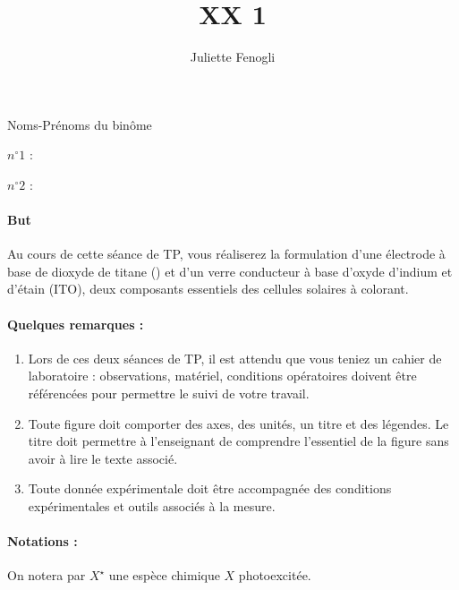 \documentclass[twoside,a4paper,11pt,addpoints,answers]{exam}%
\title{XX 1}
\date{}
\author{Juliette Fenogli}
\begin{document}
\begin{minipage}{0.33\textwidth}
Noms-Prénoms du binôme
\end{minipage}\begin{minipage}{0.33\textwidth}
$n^\circ 1$ :
\end{minipage}\begin{minipage}{0.33\textwidth}
$n^\circ 2$ :
\end{minipage}




\paragraph*{But} 
Au cours de cette séance de TP, vous réaliserez la formulation d'une électrode à base de dioxyde de titane () et d'un verre conducteur à base d'oxyde d'indium et d'étain (ITO), deux composants essentiels des cellules solaires à colorant.



\paragraph*{Quelques remarques :}
\begin{enumerate}
\item {\color{red} Lors de ces deux séances de TP, il est attendu que vous teniez un cahier de laboratoire : observations, matériel, conditions opératoires doivent être référencées pour permettre le suivi de votre travail.}
\item Toute figure doit comporter des axes, des unités, un titre et des légendes. Le titre doit permettre à l'enseignant de comprendre l'essentiel de la figure sans avoir à lire le texte associé.
\item Toute donnée expérimentale doit être accompagnée des conditions expérimentales et outils associés à la mesure.
\end{enumerate}


\paragraph*{Notations :}
On notera par $X^\star$ une espèce chimique $X$ photoexcitée.
\end{document}
